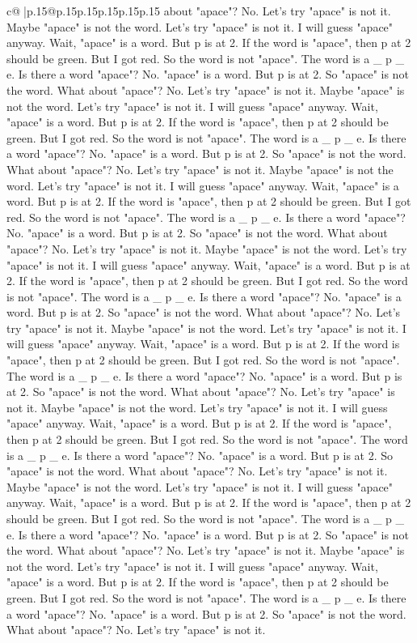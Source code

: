 \documentclass{article}
\begin{document}
{\begin{supertabular}{c@{$\;$}|p{.15\linewidth}@{}p{.15\linewidth}p{.15\linewidth}p{.15\linewidth}p{.15\linewidth}p{.15\linewidth}}
{{{about "apace"? No. Let's try "apace" is not it. Maybe "apace" is not the word. Let's try "apace" is not it. I will guess "apace" anyway. Wait, "apace" is a word. But p is at 2. If the word is "apace", then p at 2 should be green. But I got red. So the word is not "apace". The word is a \_ p \_ e. Is there a word "apace"? No. "apace" is a word. But p is at 2. So "apace" is not the word. What about "apace"? No. Let's try "apace" is not it. Maybe "apace" is not the word. Let's try "apace" is not it. I will guess "apace" anyway. Wait, "apace" is a word. But p is at 2. If the word is "apace", then p at 2 should be green. But I got red. So the word is not "apace". The word is a \_ p \_ e. Is there a word "apace"? No. "apace" is a word. But p is at 2. So "apace" is not the word. What about "apace"? No. Let's try "apace" is not it. Maybe "apace" is not the word. Let's try "apace" is not it. I will guess "apace" anyway. Wait, "apace" is a word. But p is at 2. If the word is "apace", then p at 2 should be green. But I got red. So the word is not "apace". The word is a \_ p \_ e. Is there a word "apace"? No. "apace" is a word. But p is at 2. So "apace" is not the word. What about "apace"? No. Let's try "apace" is not it. Maybe "apace" is not the word. Let's try "apace" is not it. I will guess "apace" anyway. Wait, "apace" is a word. But p is at 2. If the word is "apace", then p at 2 should be green. But I got red. So the word is not "apace". The word is a \_ p \_ e. Is there a word "apace"? No. "apace" is a word. But p is at 2. So "apace" is not the word. What about "apace"? No. Let's try "apace" is not it. Maybe "apace" is not the word. Let's try "apace" is not it. I will guess "apace" anyway. Wait, "apace" is a word. But p is at 2. If the word is "apace", then p at 2 should be green. But I got red. So the word is not "apace". The word is a \_ p \_ e. Is there a word "apace"? No. "apace" is a word. But p is at 2. So "apace" is not the word. What about "apace"? No. Let's try "apace" is not it. Maybe "apace" is not the word. Let's try "apace" is not it. I will guess "apace" anyway. Wait, "apace" is a word. But p is at 2. If the word is "apace", then p at 2 should be green. But I got red. So the word is not "apace". The word is a \_ p \_ e. Is there a word "apace"? No. "apace" is a word. But p is at 2. So "apace" is not the word. What about "apace"? No. Let's try "apace" is not it. Maybe "apace" is not the word. Let's try "apace" is not it. I will guess "apace" anyway. Wait, "apace" is a word. But p is at 2. If the word is "apace", then p at 2 should be green. But I got red. So the word is not "apace". The word is a \_ p \_ e. Is there a word "apace"? No. "apace" is a word. But p is at 2. So "apace" is not the word. What about "apace"? No. Let's try "apace" is not it. Maybe "apace" is not the word. Let's try "apace" is not it. I will guess "apace" anyway. Wait, "apace" is a word. But p is at 2. If the word is "apace", then p at 2 should be green. But I got red. So the word is not "apace". The word is a \_ p \_ e. Is there a word "apace"? No. "apace" is a word. But p is at 2. So "apace" is not the word. What about "apace"? No. Let's try "apace" is not it. }}}
\end{supertabular}}
\end{document}
